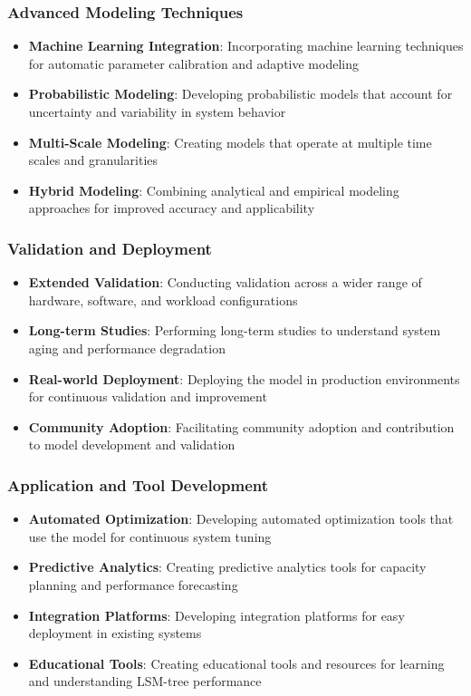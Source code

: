 \documentclass[11pt]{article}
\begin{document}
\subsubsection{Advanced Modeling Techniques}
\begin{itemize}
    \item \textbf{Machine Learning Integration}: Incorporating machine learning techniques for automatic parameter calibration and adaptive modeling
    \item \textbf{Probabilistic Modeling}: Developing probabilistic models that account for uncertainty and variability in system behavior
    \item \textbf{Multi-Scale Modeling}: Creating models that operate at multiple time scales and granularities
    \item \textbf{Hybrid Modeling}: Combining analytical and empirical modeling approaches for improved accuracy and applicability
\end{itemize}

\subsubsection{Validation and Deployment}
\begin{itemize}
    \item \textbf{Extended Validation}: Conducting validation across a wider range of hardware, software, and workload configurations
    \item \textbf{Long-term Studies}: Performing long-term studies to understand system aging and performance degradation
    \item \textbf{Real-world Deployment}: Deploying the model in production environments for continuous validation and improvement
    \item \textbf{Community Adoption}: Facilitating community adoption and contribution to model development and validation
\end{itemize}

\subsubsection{Application and Tool Development}
\begin{itemize}
    \item \textbf{Automated Optimization}: Developing automated optimization tools that use the model for continuous system tuning
    \item \textbf{Predictive Analytics}: Creating predictive analytics tools for capacity planning and performance forecasting
    \item \textbf{Integration Platforms}: Developing integration platforms for easy deployment in existing systems
    \item \textbf{Educational Tools}: Creating educational tools and resources for learning and understanding LSM-tree performance
\end{itemize}
\end{document}
